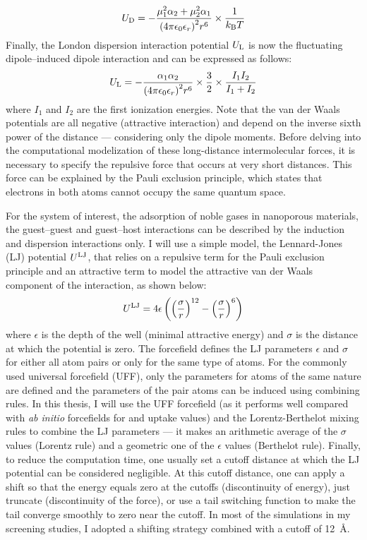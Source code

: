 \documentclass[main.tex]{subfiles}
\begin{document}
\begin{equation}\label{eq:debye}
  U_{\text{D}} = -\dfrac{\mu_1^2\alpha_2 + \mu_2^2\alpha_1}{{(4\pi\epsilon_0\epsilon_r)}^2r^6}\times\dfrac{1}{k_{\text{B}}T}
\end{equation}
Finally, the London dispersion interaction potential $U_{\text{L}}$ is now the fluctuating dipole--induced dipole interaction and can be expressed as follows:
\begin{equation}\label{eq:london}
  U_{\text{L}} = -\frac{\alpha_1\alpha_2}{{(4\pi\epsilon_0\epsilon_r)}^2r^6}\times\frac{3}{2}\times\frac{I_1 I_2}{I_1+I_2}
\end{equation}
where $I_1$ and $I_2$ are the first ionization energies. Note that the van der Waals potentials are all negative (attractive interaction) and depend on the inverse sixth power of the distance --- considering only the dipole moments. Before delving into the computational modelization of these long-distance intermolecular forces, it is necessary to specify the repulsive force that occurs at very short distances. This force can be explained by the Pauli exclusion principle, which states that electrons in both atoms cannot occupy the same quantum space.

For the system of interest, the adsorption of noble gases in nanoporous materials, the guest--guest and guest--host interactions can be described by the induction and dispersion interactions only. I will use a simple model, the Lennard-Jones (LJ) potential $U^{\text{LJ}}$,\autocite{LJ_1924} that relies on a repulsive term for the Pauli exclusion principle and an attractive term to model the attractive van der Waals component of the interaction, as shown below:
\begin{equation}\label{eq:LJ}
  U^{\text{LJ}} = 4\epsilon \left({\left(\dfrac{\sigma}{r}\right)}^{12} - {\left(\dfrac{\sigma}{r}\right)}^{6}\right)
\end{equation}
where $\epsilon$ is the depth of the well (minimal attractive energy) and $\sigma$ is the distance at which the potential is zero. The forcefield defines the LJ parameters $\epsilon$ and $\sigma$ for either all atom pairs or only for the same type of atoms. For the commonly used universal forcefield (UFF),\autocite{rappe1992} only the parameters for atoms of the same nature are defined and the parameters of the pair atoms can be induced using combining rules. In this thesis, I will use the UFF forcefield (as it performs well compared with \emph{ab initio} forcefields for  and  uptake values\autocite{McDaniel_2015}) and the Lorentz-Berthelot mixing rules to combine the LJ parameters --- it makes an arithmetic average of the $\sigma$ values (Lorentz rule) and a geometric one of the $\epsilon$ values (Berthelot rule). Finally, to reduce the computation time, one usually set a cutoff distance at which the LJ potential can be considered negligible. At this cutoff distance, one can apply a shift so that the energy equals zero at the cutoffs (discontinuity of energy), just truncate (discontinuity of the force), or use a tail switching function to make the tail converge smoothly to zero near the cutoff. In most of the simulations in my screening studies, I adopted a shifting strategy combined with a cutoff of \SI{12}{\angstrom}.
\end{document}
